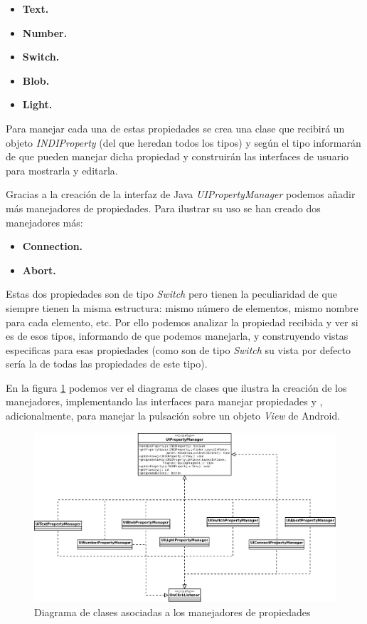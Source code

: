 \begin{itemize}
  \item \textbf{Text.}
  \item \textbf{Number.}
  \item \textbf{Switch.}
  \item \textbf{Blob.}
  \item \textbf{Light.}
\end{itemize}

\bigskip
Para manejar cada una de estas propiedades se crea una clase que recibirá un objeto \textit{INDIProperty} (del que heredan todos los tipos) y según el tipo informarán de que pueden manejar dicha propiedad y construirán las interfaces de usuario para mostrarla y editarla.

\bigskip
Gracias a la creación de la interfaz de Java \textit{UIPropertyManager} podemos añadir más manejadores de propiedades. Para ilustrar su uso se han creado dos manejadores más:

\begin{itemize}
  \item \textbf{Connection.}
  \item \textbf{Abort.}
\end{itemize}

\bigskip
Estas dos propiedades son de tipo \textit{Switch} pero tienen la peculiaridad de que siempre tienen la misma estructura: mismo número de elementos, mismo nombre para cada elemento, etc. Por ello podemos analizar la propiedad recibida y ver si es de esos tipos, informando de que podemos manejarla, y construyendo vistas especificas para esas propiedades (como son de tipo \textit{Switch} su vista por defecto sería la de todas las propiedades de este tipo).

\bigskip
En la figura \ref{fig:diag_manager_ui} podemos ver el diagrama de clases que ilustra la creación de los manejadores, implementando las interfaces para manejar propiedades y , adicionalmente, para manejar la pulsación sobre un objeto \textit{View} de Android.

\bigskip
\begin{figure}[!ht]
  \begin{center}
  \includegraphics[width=1\textwidth]{../images/manager_ui.png}
  \caption{Diagrama de clases asociadas a los manejadores de propiedades}
  \label{fig:diag_manager_ui}
  \end{center}
\end{figure}

